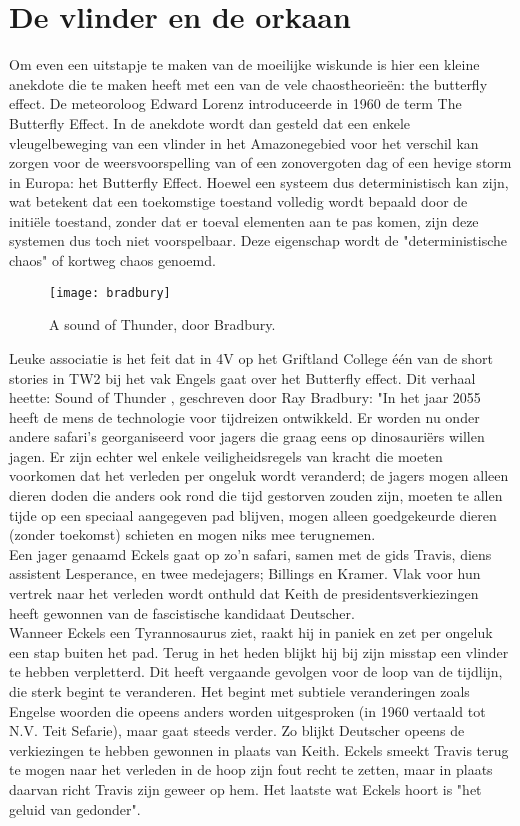 \documentclass[11pt,fleqn]{book} %
\begin{document}
\section{De vlinder en de orkaan}
Om even een uitstapje te maken van de moeilijke wiskunde is hier een kleine anekdote die te maken heeft met een van de vele chaostheorieën: the butterfly effect.
De meteoroloog Edward Lorenz introduceerde in 1960 de term The Butterfly Effect. In de anekdote wordt dan gesteld dat een enkele vleugelbeweging van een vlinder in het Amazonegebied voor het verschil kan zorgen voor de weersvoorspelling van of een zonovergoten dag of een hevige storm in Europa: het Butterfly Effect. Hoewel een systeem dus deterministisch kan zijn, wat betekent dat een toekomstige toestand volledig wordt bepaald door de initiële toestand, zonder dat er toeval elementen aan te pas komen, zijn deze systemen dus toch niet voorspelbaar. Deze eigenschap wordt de "deterministische chaos" of kortweg chaos genoemd.
\begin{figure}[h]
	\centering\texttt{[image: bradbury]}
	\caption{A sound of Thunder, door Bradbury.}
	\label{fig:bradbury}
\end{figure}
Leuke associatie is het feit dat in 4V op het Griftland College één van de short stories in TW2 bij het vak Engels gaat over het Butterfly effect. Dit verhaal heette: Sound of Thunder \cite{thunder}, geschreven door Ray Bradbury:  "In het jaar 2055 heeft de mens de technologie voor tijdreizen ontwikkeld. Er worden nu onder andere safari’s georganiseerd voor jagers die graag eens op dinosauriërs willen jagen. Er zijn echter wel enkele veiligheidsregels van kracht die moeten voorkomen dat het verleden per ongeluk wordt veranderd; de jagers mogen alleen dieren doden die anders ook rond die tijd gestorven zouden zijn, moeten te allen tijde op een speciaal aangegeven pad blijven, mogen alleen goedgekeurde dieren (zonder toekomst) schieten en mogen niks mee terugnemen.\\
Een jager genaamd Eckels gaat op zo’n safari, samen met de gids Travis, diens assistent Lesperance, en twee medejagers; Billings en Kramer. Vlak voor hun vertrek naar het verleden wordt onthuld dat Keith de presidentsverkiezingen heeft gewonnen van de fascistische kandidaat Deutscher.\\
Wanneer Eckels een Tyrannosaurus ziet, raakt hij in paniek en zet per ongeluk een stap buiten het pad. Terug in het heden blijkt hij bij zijn misstap een vlinder te hebben verpletterd. Dit heeft vergaande gevolgen voor de loop van de tijdlijn, die sterk begint te veranderen. Het begint met subtiele veranderingen zoals Engelse woorden die opeens anders worden uitgesproken (in 1960 vertaald tot N.V. Teit Sefarie), maar gaat steeds verder. Zo blijkt Deutscher opeens de verkiezingen te hebben gewonnen in plaats van Keith. Eckels smeekt Travis terug te mogen naar het verleden in de hoop zijn fout recht te zetten, maar in plaats daarvan richt Travis zijn geweer op hem. Het laatste wat Eckels hoort is "het geluid van gedonder".
\end{document}
